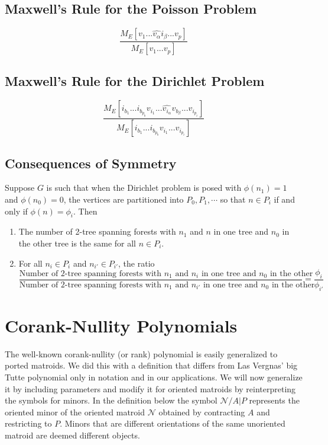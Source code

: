 \documentclass[12pt]{article}
\theoremstyle{definition}
\begin{document}
\subsection{Maxwell's Rule for the Poisson Problem}


\[
\frac{M_E[v_1 ... 
      \hat{v_{\alpha}} i_{\beta} ...  v_p]}
{M_E[v_1 ... v_p]}
\]



\newpage
\subsection{Maxwell's Rule for the Dirichlet Problem}

\[
\frac{M_E[i_{b_1} ... i_{b_{p_b}}v_{i_1} ...  
      \hat{v_{i_{\alpha}}} v_{b_{\beta}} ...  v_{i_{p_i}}]}
{M_E[i_{b_1} ... i_{b_{p_b}}v_{i_1} ... v_{i_{p_i}}]}
\]




\subsection{Consequences of Symmetry}

Suppose $G$ is such that when the Dirichlet problem is posed with
$\phi(n_1)=1$ and $\phi(n_0)=0$, the vertices are partitioned 
into $P_0, P_1, \cdots $ so that $n\in P_i$ if and only if
$\phi(n)=\phi_i$.  Then
\begin{enumerate}
\item The number of 2-tree spanning forests with $n_1$ and $n$ in one
tree and $n_0$ in the other tree is the same for all $n\in P_i$.
\item For all $n_i\in P_i$  and $n_{i'}\in P_{i'}$, the ratio
\[
\frac{\text{Number of 2-tree spanning forests with $n_1$ and $n_{i}$ in one
tree and $n_0$ in the other}}{\text{Number of 2-tree spanning forests with $n_1$ and $n_{i'}$ in one
tree and $n_0$ in the other}}
=
\frac{\phi_i}{\phi_{i'}}
\]
\end{enumerate}

\section{Corank-Nullity Polynomials}
\label{Classify}

The well-known corank-nullity (or rank) polynomial is easily
generalized to ported matroids.  
We did\cite{sdcPorted} this
with a definition that differs from 
Las Vergnas' 
big Tutte polynomial \cite{SetPointedLV}
only in notation and in our applications.
We will now generalize it by including parameters and modify it
for oriented matroids by reinterpreting the symbols
for minors.
In the definition below
the symbol $\mathcal{N}/A|P$ represents the oriented minor
of the oriented matroid $\mathcal{N}$ obtained by contracting
$A$ and restricting to $P$.  Minors that are
different orientations of the same unoriented matroid are deemed
different objects.
\end{document}
